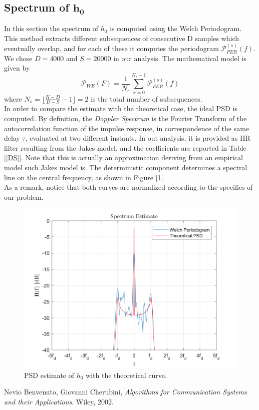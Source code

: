 \documentclass[a4paper, 12pt]{report}
\begin{document}
\clearpage
\subsection*{Spectrum of $\mathbf{h_0}$}
In this section the spectrum of $h_0$ is computed using the Welch Periodogram. This method extracts different subsequences of consecutive D samples which eventually overlap, and for each of these it computes the periodogram $\mathcal{P}_{PER}^{\left(s\right)}(f)$. We chose $D=4000$ and $S=20000$ in our analysis. The mathematical model is given by
\begin{equation*}
\mathcal{P}_{WE}(F) = \frac{1}{N_s}\sum_{x=0}^{N_s-1}\mathcal{P}_{PER}^{(s)}(f)
\end{equation*}
where $N_s = \lfloor \frac{K-D}{D-S}-1 \rfloor = 2$ is the total number of subsequences. \\
In order to compare the estimate with the theoretical case, the ideal PSD is computed. By definition, the \textit{Doppler Spectrum} is the Fourier Transform of the autocorrelation function of the impulse response, in correspondence of the same delay $\tau$, evaluated at two different instants. In out analysis, it is provided as IIR filter resulting from the Jakes model, and the coefficients are reported in Table [\ref{DS}]. Note that this is actually an approximation deriving from an empirical model such Jakes model is. The deterministic component determines a spectral line on the central frequency, as shown in Figure [\ref{Welch}].\\
As a remark, notice that both curves are normalized according to the specifics of our problem.

\begin{figure}[H]
	\centering
	\includegraphics[width=14cm]{images/Welch_2}
	\caption{PSD estimate of $h_0$ with the theoretical curve.}\label{Welch}
\end{figure}

\begin{thebibliography}{15}
	Nevio Benvenuto, Giovanni Cherubini,
	\textit{Algorithms for Communication Systems and their Applications}. 
	Wiley, 2002.
\end{thebibliography}
\end{document}
